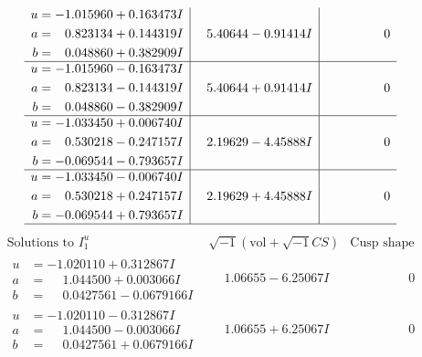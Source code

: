\documentclass[1p]{elsarticle_modified}
\theoremstyle{definition}
\newcommand{\I}{\sqrt{-1}}
\begin{document}
$$\begin{array}{c|c|c}
\begin{aligned}
u &= -1.015960 + 0.163473 I \\
a &= \phantom{-}0.823134 + 0.144319 I \\
b &= \phantom{-}0.048860 + 0.382909 I\end{aligned}
 & \phantom{-}5.40644 - 0.91414 I & \phantom{-0.000000 } 0 \\ \hline\begin{aligned}
u &= -1.015960 - 0.163473 I \\
a &= \phantom{-}0.823134 - 0.144319 I \\
b &= \phantom{-}0.048860 - 0.382909 I\end{aligned}
 & \phantom{-}5.40644 + 0.91414 I & \phantom{-0.000000 } 0 \\ \hline\begin{aligned}
u &= -1.033450 + 0.006740 I \\
a &= \phantom{-}0.530218 - 0.247157 I \\
b &= -0.069544 - 0.793657 I\end{aligned}
 & \phantom{-}2.19629 - 4.45888 I & \phantom{-0.000000 } 0 \\ \hline\begin{aligned}
u &= -1.033450 - 0.006740 I \\
a &= \phantom{-}0.530218 + 0.247157 I \\
b &= -0.069544 + 0.793657 I\end{aligned}
 & \phantom{-}2.19629 + 4.45888 I & \phantom{-0.000000 } 0\\
 \hline 
 \end{array}$$\newpage$$\begin{array}{c|c|c}  
\text{Solutions to }I^u_{1}& \I (\text{vol} + \sqrt{-1}CS) & \text{Cusp shape}\\
 \hline 
\begin{aligned}
u &= -1.020110 + 0.312867 I \\
a &= \phantom{-}1.044500 + 0.003066 I \\
b &= \phantom{-}0.0427561 - 0.0679166 I\end{aligned}
 & \phantom{-}1.06655 - 6.25067 I & \phantom{-0.000000 } 0 \\ \hline\begin{aligned}
u &= -1.020110 - 0.312867 I \\
a &= \phantom{-}1.044500 - 0.003066 I \\
b &= \phantom{-}0.0427561 + 0.0679166 I\end{aligned}
 & \phantom{-}1.06655 + 6.25067 I & \phantom{-0.000000 } 0 \\ \hline\begin{aligned}

\end{aligned}
\end{array}$$
\end{document}
